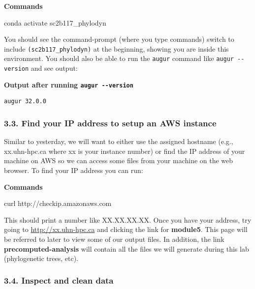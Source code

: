 \documentclass[
]{book}
\newenvironment{Shaded}{\begin{snugshade}}{\end{snugshade}}
\newcommand{\ExtensionTok}[1]{#1}
\newcommand{\NormalTok}[1]{#1}
\begin{document}
\textbf{Commands}

\begin{Shaded}
\begin{Highlighting}[]
\ExtensionTok{conda}\NormalTok{ activate sc2b117\_phylodyn}
\end{Highlighting}
\end{Shaded}

You should see the command-prompt (where you type commands) switch to include \texttt{(sc2b117\_phylodyn)} at the beginning, showing you are inside this environment. You should also be able to run the \texttt{augur} command like \texttt{augur\ -\/-version} and see output:

\textbf{Output after running \texttt{augur\ -\/-version}}

\begin{verbatim}
augur 32.0.0 
\end{verbatim}

\subsubsection{3.3. Find your IP address to setup an AWS instance}\label{find-your-ip-address-to-setup-an-aws-instance}

Similar to yesterday, we will want to either use the assigned hostname (e.g., xx.uhn-hpc.ca where xx is your instance number) or find the IP address of your machine on AWS so we can access some files from your machine on the web browser. To find your IP address you can run:

\textbf{Commands}

\begin{Shaded}
\begin{Highlighting}[]
\ExtensionTok{curl}\NormalTok{ http://checkip.amazonaws.com}
\end{Highlighting}
\end{Shaded}

This should print a number like XX.XX.XX.XX. Once you have your address, try going to \url{http://xx.uhn-hpc.ca} and clicking the link for \textbf{module5}. This page will be referred to later to view some of our output files. In addition, the link \textbf{precomputed-analysis} will contain all the files we will generate during this lab (phylogenetic trees, etc).

\subsubsection{3.4. Inspect and clean data}\label{inspect-and-clean-data}
\end{document}
